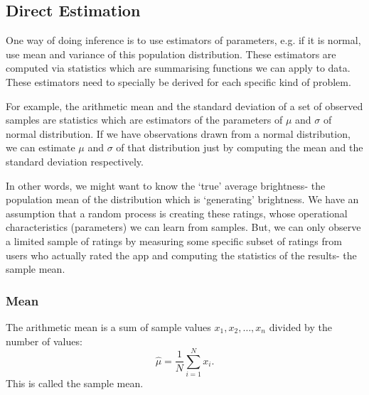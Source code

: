 \documentclass[a4paper, openany]{memoir}
\begin{document}
\subsection{Direct Estimation}
One way of doing inference is to use estimators of parameters, e.g. if it is normal, use mean and variance of this population distribution. These estimators are computed via statistics which are summarising functions we can apply to data. These estimators need to specially be derived for each specific kind of problem.

For example, the arithmetic mean and the standard deviation of a set of observed samples are statistics which are estimators of the parameters of $\mu$ and $\sigma$ of normal distribution. If we have observations drawn from a normal distribution, we can estimate $\mu$ and $\sigma$ of that distribution just by computing the mean and the standard deviation respectively.

In other words, we might want to know the `true' average brightness- the population mean of the distribution which is `generating' brightness. We have an assumption that a random process is creating these ratings, whose operational characteristics (parameters) we can learn from samples. But, we can only observe a limited sample of ratings by measuring some specific subset of ratings from users who actually rated the app and computing the statistics of the results- the sample mean.

\subsubsection{Mean}
The arithmetic mean is a sum of sample values $x_1, x_2, \dots, x_n$ divided by the number of values:
\[\hat{\mu} = \frac{1}{N} \sum_{i=1}^N x_i.\]
This is called the sample mean. 
\end{document}
